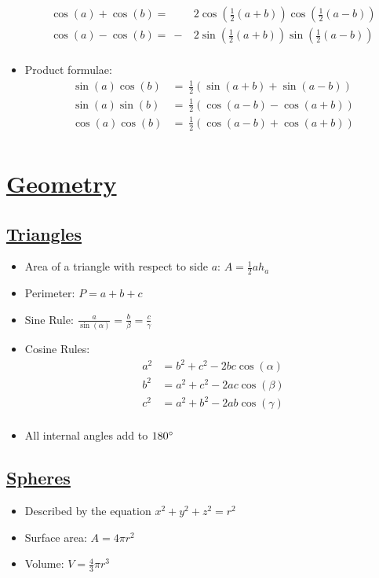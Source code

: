 \documentclass{article}
\begin{document}
\begin{itemize}
\begin{align*}
      \cos(a) + \cos(b) =\ &2\cos\left(\frac{1}{2}(a + b)\right)\cos\left(\frac{1}{2}(a - b)\right)\\
      \cos(a) - \cos(b) =\ -&2\sin\left(\frac{1}{2}(a + b)\right)\sin\left(\frac{1}{2}(a - b)\right)\\
    \end{align*}
  \item Product formulae:
      \begin{align*}
        \sin(a)\cos(b) &=\ \frac{1}{2}(\sin(a + b) + \sin(a - b))\\
        \sin(a)\sin(b) &=\ \frac{1}{2}(\cos(a - b) - \cos(a + b))\\
        \cos(a)\cos(b) &=\ \frac{1}{2}(\cos(a - b) + \cos(a + b))\\
      \end{align*}
\end{itemize}

\section{\underline{Geometry}}
\subsection{\underline{Triangles}}
\begin{itemize}
  \item Area of a triangle with respect to side $a$: $A = \frac{1}{2}ah_{a}$
  \item Perimeter: $P = a + b + c$
  \item Sine Rule: $\frac{a}{\sin(\alpha)} = \frac{b}{\beta} = \frac{c}{\gamma}$
  \item Cosine Rules:
    \begin{align*}
      a^{2} &= b^{2} + c^{2} - 2bc\cos(\alpha)\\
      b^{2} &= a^{2} + c^{2} - 2ac\cos(\beta)\\
      c^{2} &= a^{2} + b^{2} - 2ab\cos(\gamma)\\
    \end{align*}
  \item All internal angles add to $180\degree$
\end{itemize}

\subsection{\underline{Spheres}}
\begin{itemize}
  \item Described by the equation $x^{2} + y^{2} + z^{2} = r^{2}$
  \item Surface area: $A = 4\pi r^{2}$
  \item Volume: $V = \frac{4}{3}\pi r^{3}$
\end{itemize}
\end{document}
